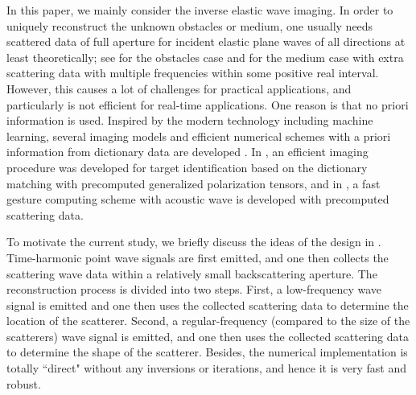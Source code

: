 \documentclass[a4paper,11pt]{article}
\theoremstyle{remark}
\theoremstyle{definition}
\numberwithin{equation}{section}
\begin{document}
In this paper, we mainly consider the inverse elastic wave imaging. In order to uniquely reconstruct the unknown obstacles or medium, one usually needs scattered data of full aperture for incident elastic plane waves of all directions at least theoretically; see \cite{PH} for the obstacles case and \cite{PH0} for the medium case with extra scattering data with multiple frequencies within some positive real interval. However, this causes a lot of challenges for practical applications, and particularly is not efficient for real-time applications. One reason is that no priori information is used. Inspired by the modern technology including machine learning, several imaging models and efficient numerical schemes with a priori information from dictionary data are developed \cite{AA1,AA2,AA3,LWY}. In \cite{AA1}, an efficient imaging procedure was developed for target identification based on the dictionary matching with precomputed generalized polarization tensors, and in \cite{LWY}, a
fast gesture computing scheme with acoustic wave is developed with precomputed scattering data.


To motivate the current study, we briefly discuss the ideas of the design in \cite{LWY}. Time-harmonic point wave signals are first emitted, and one then collects the scattering wave data within a relatively small backscattering aperture. The reconstruction process is divided into two steps. First, a low-frequency wave signal is emitted and one then uses the collected scattering data to determine the location of the scatterer. Second, a regular-frequency (compared to the size of the scatterers) wave signal is emitted, and one then uses the collected scattering data to determine the shape of the scatterer. Besides, the numerical implementation is totally ``direct" without any inversions or iterations, and hence it is very fast and robust.
\end{document}
